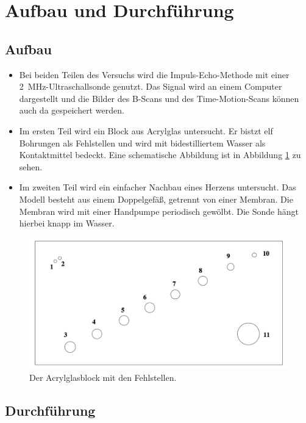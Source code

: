 \section{Aufbau und Durchführung}
\label{sec:Durchführung}

\subsection{Aufbau}

\begin{itemize}
  \item Bei beiden Teilen des Versuchs wird die Impuls-Echo-Methode mit einer
    \SI{2}{\mega\hertz}-Ultraschallsonde genutzt. Das Signal wird an einem Computer dargestellt und
    die Bilder des B-Scans und des Time-Motion-Scans können auch da gespeichert
    werden.
  \item Im ersten Teil wird ein Block aus Acrylglas untersucht. Er bistzt
    elf Bohrungen als Fehlstellen und wird mit bidestilliertem Wasser als
    Kontaktmittel bedeckt. Eine schematische Abbildung ist in Abbildung
    \ref{fig:acrylblock} zu sehen.
  \item Im zweiten Teil wird ein einfacher Nachbau eines Herzens untersucht.
    Das Modell besteht aus einem Doppelgefäß, getrennt von einer Membran. Die
    Membran wird mit einer Handpumpe periodisch gewölbt. Die Sonde hängt hierbei
    knapp im Wasser.
\end{itemize}

\begin{figure}
  \centering
  \includegraphics[width=\textwidth]{Pics/block.pdf}
  \caption{Der Acrylglasblock mit den Fehlstellen.\cite{anleitung}}
  \label{fig:acrylblock}
\end{figure}

\subsection{Durchführung}

